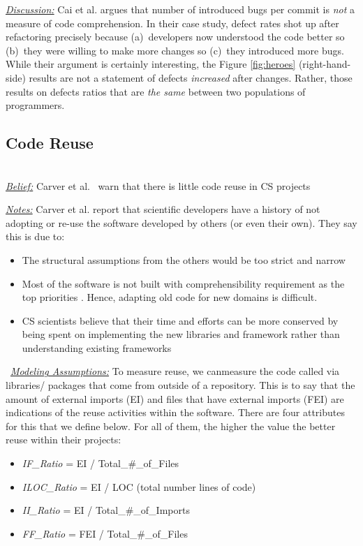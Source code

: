 \documentclass[sigconf]{acmart}
\newcommand{\bi}{\begin{itemize}}
\newcommand{\ei}{\end{itemize}}
\begin{document}
\noindent \textit{\underline{Discussion:}} 
Cai et al. \cite{cai19_debt} argues that number of introduced bugs
per commit is {\em not} a measure of code comprehension.
In their case study, defect rates shot up after refactoring
precisely because (a)~developers now understood the code better so (b)~they were willing to make more changes so (c)~they
introduced more bugs. While their argument is certainly interesting, the Figure \ref{fig:heroes} (right-hand-side) results
are not a statement of defects {\em increased} after changes.
Rather, those results on defects ratios that are {\em the same} between two populations of programmers. 




\subsection{Code Reuse} ~\\
\noindent \textit{\underline{Belief:}} 
Carver et al.~\cite{segal07_problem, carver06_hpc, Shull05_parallel, sanders08_risk} warn that there is little
code reuse in CS projects

\noindent \textit{\underline{Notes:}} 
Carver et al. report that scientific developers have a history of not adopting or re-use the software developed by others (or even their own). They 
say this is due to:

\bi
\item The structural assumptions from the others would be too strict and narrow \cite{carver06_hpc, basili08_hpc}
\item Most of the software is not built with comprehensibility requirement as the top priorities \cite{segal07_problem}. Hence, adapting old code for new domains is difficult.
\item
CS scientists believe that their time and efforts can be more conserved by being spent on implementing the new libraries and framework rather than understanding existing frameworks
\ei
\noindent ~\textit{\underline{Modeling Assumptions:}} To
measure reuse, we canmeasure the  code called
via libraries/ packages that come from outside of a repository. This is to say that the amount of external imports (EI) and files that have external imports (FEI) are indications of the reuse activities within the software. There are four attributes for this that we define below. For all of them, the higher the value the better reuse within their projects: 

\bi
\item \textit{IF\_Ratio} = EI / Total\_\#\_of\_Files
\item \textit{ILOC\_Ratio} = EI / LOC (total number lines of code)
\item \textit{II\_Ratio} = EI / Total\_\#\_of\_Imports 
\item \textit{FF\_Ratio} = FEI / Total\_\#\_of\_Files
\ei
\end{document}
